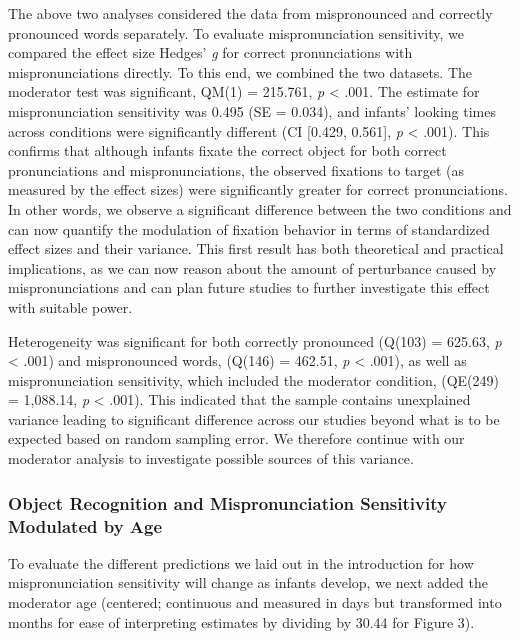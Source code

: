 \documentclass[man]{apa6}
\theoremstyle{definition}
\theoremstyle{definition}
\theoremstyle{definition}
\theoremstyle{remark}
\begin{document}
The above two analyses considered the data from mispronounced and
correctly pronounced words separately. To evaluate mispronunciation
sensitivity, we compared the effect size Hedges' \emph{g} for correct
pronunciations with mispronunciations directly. To this end, we combined
the two datasets. The moderator test was significant, QM(1) = 215.761,
\emph{p} \textless{} .001. The estimate for mispronunciation sensitivity
was 0.495 (SE = 0.034), and infants' looking times across conditions
were significantly different (CI {[}0.429, 0.561{]}, \emph{p}
\textless{} .001). This confirms that although infants fixate the
correct object for both correct pronunciations and mispronunciations,
the observed fixations to target (as measured by the effect sizes) were
significantly greater for correct pronunciations. In other words, we
observe a significant difference between the two conditions and can now
quantify the modulation of fixation behavior in terms of standardized
effect sizes and their variance. This first result has both theoretical
and practical implications, as we can now reason about the amount of
perturbance caused by mispronunciations and can plan future studies to
further investigate this effect with suitable power.

Heterogeneity was significant for both correctly pronounced (Q(103) =
625.63, \emph{p} \textless{} .001) and mispronounced words, (Q(146) =
462.51, \emph{p} \textless{} .001), as well as mispronunciation
sensitivity, which included the moderator condition, (QE(249) =
1,088.14, \emph{p} \textless{} .001). This indicated that the sample
contains unexplained variance leading to significant difference across
our studies beyond what is to be expected based on random sampling
error. We therefore continue with our moderator analysis to investigate
possible sources of this variance.

\subsubsection{Object Recognition and Mispronunciation Sensitivity
Modulated by
Age}\label{object-recognition-and-mispronunciation-sensitivity-modulated-by-age}

To evaluate the different predictions we laid out in the introduction
for how mispronunciation sensitivity will change as infants develop, we
next added the moderator age (centered; continuous and measured in days
but transformed into months for ease of interpreting estimates by
dividing by 30.44 for Figure 3).
\end{document}
